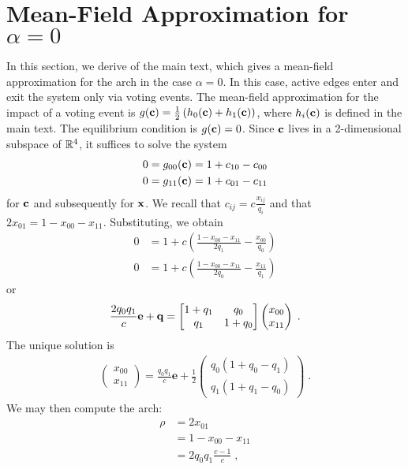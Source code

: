 \documentclass[final,supplement,onefignum,onetabnum]{siamart171218}
\begin{document}
\section{Mean-Field Approximation for $\alpha = 0$} \label{sec:SI_alpha_0}
  In this section, we derive  of the main text, which gives a mean-field approximation for the arch in the case $\alpha = 0$. 
  In this case, active edges enter and exit the system only via voting events. 
  The mean-field approximation for the impact of a voting event is $g(\mathbf{c}) = \frac{1}{2}\left(h_0(\mathbf{c}) + h_1(\mathbf{c})\right)$, where $h_i(\mathbf{c})$ is defined in the main text. 
  The equilibrium condition is $g(\mathbf{c}) = 0$. 
	Since $\mathbf{c}$ lives in a 2-dimensional subspace of $\mathbb{R}^4$, it suffices to solve the system
	\begin{align*}
		0 &= g_{00}(\mathbf{c}) = 1 + c_{10} - c_{00} \\ 
		0 &= g_{11}(\mathbf{c}) = 1 + c_{01} - c_{11} 
	\end{align*}
	for $\mathbf{c}$ and subsequently for $\mathbf{x}$.  
  We recall that $c_{ij} = c\frac{x_{ij}}{q_i}$ and that $2x_{01} = 1 - x_{00} - x_{11}$. 
  Substituting, we obtain 
  \begin{align*}
    0 &= 1 +c \left(\frac{1 - x_{00} - x_{11}}{2q_1}  - \frac{x_{00}}{q_0}\right) \\ 
    0 &= 1 +c \left(\frac{1 - x_{00} - x_{11}}{2q_0}  - \frac{x_{11}}{q_1}\right) 
  \end{align*}
  or 
  \begin{align*}
    \frac{2q_0q_1}{c}\mathbf{e} + \mathbf{q} = \left[\begin{matrix} 1 + q_1 & q_0 \\ q_1 & 1 + q_0 \end{matrix}\right]\left(\begin{matrix}x_{00} \\ x_{11}\end{matrix}\right)\;.
  \end{align*}
  The unique solution is 
  \begin{align*}
    \left(\begin{matrix}x_{00} \\ x_{11}\end{matrix}\right) = \frac{q_0 q_1}{c} \mathbf{e} + \frac{1}{2}\left(\begin{matrix} q_0(1 + q_0 - q_1) \\ q_1(1 + q_1 - q_0) \end{matrix}\right)\;.
  \end{align*}
  We may then compute the arch: 
  \begin{align*}
    \rho &= 2x_{01} \\ 
         &= 1 - x_{00} - x_{11} \\ 
         &= 2q_0 q_1 \frac{c-1}{c}\;,
  \end{align*}
\end{document}
